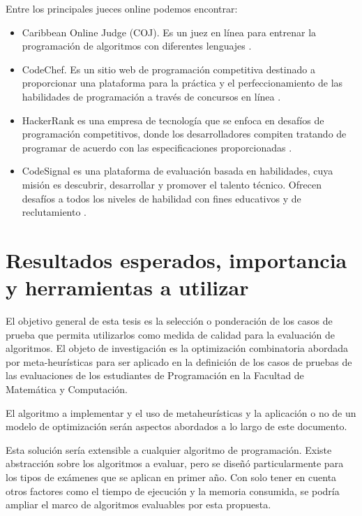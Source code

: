 \documentclass[a4paper,openright,11pt,oneside]{book}
\begin{document}
	Entre los principales jueces online podemos encontrar: 
	\begin{itemize}
		
		\item Caribbean Online Judge (COJ). Es un juez en línea para entrenar la programación de algoritmos con diferentes lenguajes \cite{COJ}.
		
		\item CodeChef. Es un sitio web de programación competitiva destinado a proporcionar una plataforma para la práctica y el perfeccionamiento de las habilidades de programación a través de concursos en línea \cite{codechef}.
		
		\item HackerRank es una empresa de tecnología que se enfoca en desafíos de programación competitivos, donde los desarrolladores compiten tratando de programar de acuerdo con las especificaciones proporcionadas \cite{hackerRank}.
		
		\item CodeSignal es una plataforma de evaluación basada en habilidades, cuya misión es descubrir, desarrollar y promover el talento técnico. Ofrecen desafíos a todos los niveles de habilidad con fines educativos y de reclutamiento \cite{codeSignal}.
		
	\end{itemize}
		
	\section{Resultados esperados, importancia y herramientas a utilizar}
	
		El objetivo general de esta tesis es la selección o ponderación de los casos de prueba que permita utilizarlos como medida de calidad para la evaluación de algoritmos. El objeto de investigación es la optimización combinatoria \cite{baykasouglu2014testing} abordada por meta-heurísticas \cite{OptimizacionCombinatoria} para ser aplicado en la definición de los casos de pruebas de las evaluaciones de los estudiantes de Programación en la Facultad de Matemática y Computación.
		
		El algoritmo a implementar y el uso de metaheurísticas y la aplicación o no de un modelo de optimización serán aspectos abordados a lo largo de este documento.
		
		Esta solución sería extensible a cualquier algoritmo de programación. Existe abstracción sobre los algoritmos a evaluar, pero se diseñó particularmente para los tipos de exámenes que se aplican en primer año. Con solo tener en cuenta otros factores como el tiempo de ejecución y la memoria consumida, se podría ampliar el marco de algoritmos evaluables por esta propuesta.
		
\end{document}
